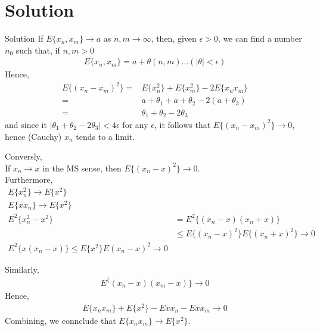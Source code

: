 \documentclass{beamer}
\begin{document}
\section{Solution}
\begin{frame}{Solution}
    If $E\{x_n,x_m\} \rightarrow  a $ as $n,m \rightarrow  \infty$, then, given $\epsilon>0$, we can find a number $n_0$ such that, if $n,m > 0$
    \begin{align}
        E\{x_n,x_m\} = a + \theta(n,m) \dots (|\theta| < \epsilon)
    \end{align}
    Hence,
    \begin{align}
        E\{(x_n - x_m)^2\} = &E\{x_n ^2\} + E\{x_m ^2\} - 2E\{x_nx_m\} \\
         = &a + \theta_1 + a + \theta_2 - 2(a + \theta_3) \\
         = &\theta_1 + \theta_2 - 2\theta_3
    \end{align}
    and since it $|\theta_1 + \theta_2 - 2\theta_3| < 4\epsilon$ for any $\epsilon$, it follows that $E\{(x_n - x_m)^2\}\rightarrow 0$, hence (Cauchy) $x_n$ tends to a limit.
\end{frame}
\begin{frame}
    Conversly, \\
    If $x_n \rightarrow x$ in the MS sense, then $E\{(x_n - x)^2\} \rightarrow 0$. \\
    Furthermore, 
    \begin{align}
        E\{x_n ^2\} \rightarrow E\{x^2\} \\
        E\{xx_n\} \rightarrow E\{x^2\} \\
        E^2\{x_n ^2 - x^2\} &= E^2 \{(x_n - x)(x_n + x)\} \\
         &\leq E\{(x_n - x)^2\}E\{(x_n + x)^2\} \rightarrow 0 \\
         E^2\{x(x_n -x)\} \leq E\{x^2\}E{(x_n - x)^2} \rightarrow 0
    \end{align}
\end{frame}
\begin{frame}
    Similarly, 
    \begin{align}
        E^\{(x_n - x)(x_m - x)\} \rightarrow 0
    \end{align}
    Hence,
    \begin{align}
        E\{x_nx_m\} + E\{x^2\} - E{xx_n} - E{xx_m} \rightarrow 0 
    \end{align}
    Combining, we connclude that $E\{x_nx_m\} \rightarrow E\{x^2\}$.
\end{frame}
\end{document}
